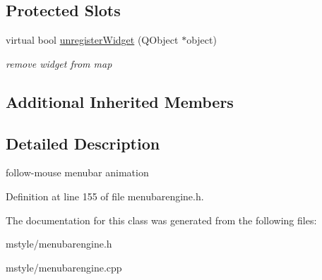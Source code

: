 \subsection*{Protected Slots}
\begin{DoxyCompactItemize}
\item 
\mbox{\label{class_menu_bar_engine_v2_aaf80ad00347051a27db38f0a2d720f01}} 
virtual bool \hyperlink{class_menu_bar_engine_v2_aaf80ad00347051a27db38f0a2d720f01}{unregister\+Widget} (Q\+Object $\ast$object)
\begin{DoxyCompactList}\small\item\em remove widget from map \end{DoxyCompactList}\end{DoxyCompactItemize}
\subsection*{Additional Inherited Members}


\subsection{Detailed Description}
follow-\/mouse menubar animation 

Definition at line 155 of file menubarengine.\+h.



The documentation for this class was generated from the following files\+:\begin{DoxyCompactItemize}
\item 
mstyle/menubarengine.\+h\item 
mstyle/menubarengine.\+cpp\end{DoxyCompactItemize}
